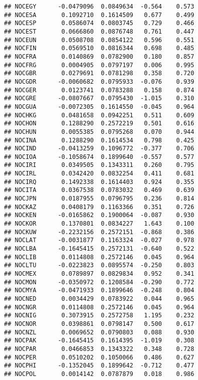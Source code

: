 \documentclass[]{article}
\begin{document}
\begin{verbatim}
## NOCEGY      -0.0479096  0.0849634  -0.564    0.573    
## NOCESA       0.1092710  0.1614509   0.677    0.499    
## NOCESP       0.0586074  0.0803745   0.729    0.466    
## NOCEST       0.0666860  0.0876748   0.761    0.447    
## NOCEUN       0.0508708  0.0854122   0.596    0.551    
## NOCFIN       0.0569510  0.0816344   0.698    0.485    
## NOCFRA       0.0140869  0.0782900   0.180    0.857    
## NOCFRG       0.0004905  0.0797197   0.006    0.995    
## NOCGBR       0.0279691  0.0781298   0.358    0.720    
## NOCGDR      -0.0060682  0.0795933  -0.076    0.939    
## NOCGER       0.0123741  0.0783288   0.158    0.874    
## NOCGRE      -0.0807667  0.0795430  -1.015    0.310    
## NOCGUA      -0.0072305  0.1614550  -0.045    0.964    
## NOCHKG       0.0481658  0.0942251   0.511    0.609    
## NOCHON       0.1288290  0.2572219   0.501    0.616    
## NOCHUN       0.0055385  0.0795268   0.070    0.944    
## NOCINA       0.1288290  0.1614534   0.798    0.425    
## NOCIND      -0.0413259  0.1096772  -0.377    0.706    
## NOCIOA      -0.1058674  0.1899640  -0.557    0.577    
## NOCIRI       0.0349505  0.1343311   0.260    0.795    
## NOCIRL       0.0342420  0.0832254   0.411    0.681    
## NOCIRQ       0.1492338  0.1614403   0.924    0.355    
## NOCITA       0.0367538  0.0783032   0.469    0.639    
## NOCJPN       0.0187955  0.0796795   0.236    0.814    
## NOCKAZ       0.0408179  0.1163366   0.351    0.726    
## NOCKEN      -0.0165862  0.1900064  -0.087    0.930    
## NOCKOR       0.1370801  0.0834227   1.643    0.100    
## NOCKUW      -0.2232156  0.2572151  -0.868    0.386    
## NOCLAT      -0.0031877  0.1163324  -0.027    0.978    
## NOCLBA      -0.1645415  0.2572131  -0.640    0.522    
## NOCLIB       0.0114808  0.2572146   0.045    0.964    
## NOCLTU      -0.0223823  0.0895574  -0.250    0.803    
## NOCMEX       0.0789897  0.0829834   0.952    0.341    
## NOCMON      -0.0350972  0.1208584  -0.290    0.772    
## NOCMYA      -0.0471933  0.1899646  -0.248    0.804    
## NOCNED       0.0034429  0.0783922   0.044    0.965    
## NOCNGR       0.0114808  0.2572146   0.045    0.964    
## NOCNIG       0.3073915  0.2572758   1.195    0.232    
## NOCNOR       0.0398861  0.0798147   0.500    0.617    
## NOCNZL       0.0069652  0.0790803   0.088    0.930    
## NOCPAK      -0.1645415  0.1614395  -1.019    0.308    
## NOCPAR       0.0466853  0.1343322   0.348    0.728    
## NOCPER       0.0510202  0.1050066   0.486    0.627    
## NOCPHI      -0.1352045  0.1899642  -0.712    0.477    
## NOCPOL       0.0014142  0.0787879   0.018    0.986    

\end{verbatim}
\end{document}
